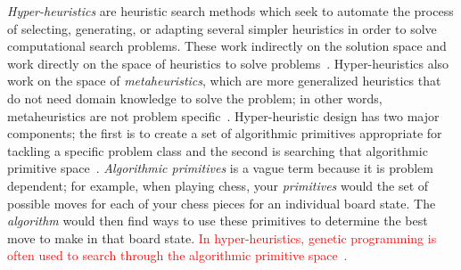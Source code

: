 \documentclass{sig-alternate}
\begin{document}
\textit{Hyper-heuristics} are heuristic search methods which seek to automate the process of selecting, generating, or adapting several simpler heuristics in order to solve computational search problems. These work indirectly on the solution space and work directly on the space of heuristics to solve problems~\cite{tauritz:tutorial}. Hyper-heuristics also work on the space of \textit{metaheuristics}, which are more generalized heuristics that do not need domain knowledge to solve the problem; in other words, metaheuristics are not problem specific~\cite{tauritz:tutorial}. Hyper-heuristic design has two major components; the first is to create a set of algorithmic primitives appropriate for tackling a specific problem class and the second is searching that algorithmic primitive space~\cite{harris:2015}. \textit{Algorithmic primitives} is a vague term because it is problem dependent; for example, when playing chess, your \textit{primitives} would the set of possible moves for each of your chess pieces for an individual board state. The \textit{algorithm} would then find ways to use these primitives to determine the best move to make in that board state. \textcolor{red}{In hyper-heuristics, genetic programming is often used to search through the algorithmic primitive space~\cite{harris:2015}.}
\end{document}
